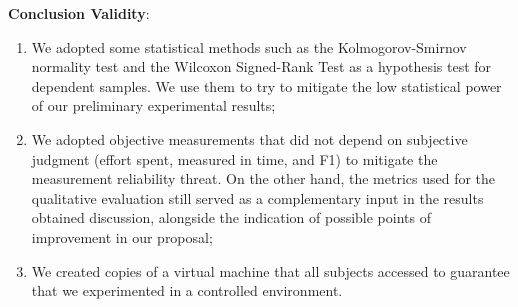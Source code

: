 \textbf{Conclusion Validity}: 
\begin{enumerate} [label=\roman*.]
    \item We adopted some statistical methods such as the Kolmogorov-Smirnov normality test and the Wilcoxon Signed-Rank Test as a hypothesis test for dependent samples. We use them to try to mitigate the low statistical power of our preliminary experimental results;
    \item We adopted objective measurements that did not depend on subjective judgment (effort spent, measured in time, and F1) to mitigate the measurement reliability threat.
    On the other hand, the metrics used for the qualitative evaluation still served as a complementary input in the results obtained discussion, alongside the indication of possible points of improvement in our proposal;
    \item We created copies of a virtual machine that all subjects accessed to guarantee that we experimented in a controlled environment.
\end{enumerate}

